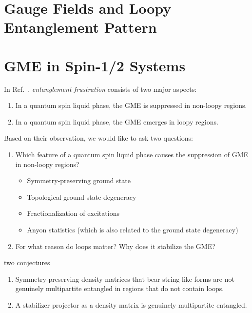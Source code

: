 \documentclass[12font]{article}
\numberwithin{equation}{section}    %
\theoremstyle{definition}
\begin{document}
\section{Gauge Fields and Loopy Entanglement Pattern}

\section{GME in Spin-1/2 Systems}
In Ref.~\cite{Lyu-Chandorkar-Kapoor-Takei-Sorensen-Witczak-Krempa_2026}, \textit{entanglement frustration} consists of two major aspects:
\begin{enumerate}
    \item In a quantum spin liquid phase, the GME is suppressed in non-loopy regions.
    \item In a quantum spin liquid phase, the GME emerges in loopy regions.
\end{enumerate}
Based on their observation, we would like to ask two questions:
\begin{enumerate}
    \item Which feature of a quantum spin liquid phase causes the suppression of GME in non-loopy regions? 
    \begin{itemize}
        \item Symmetry-preserving ground state
        \item Topological ground state degeneracy
        \item Fractionalization of excitations 
        \item Anyon statistics (which is also related to the ground state degeneracy)
    \end{itemize} 
    \item For what reason do loops matter? Why does it stabilize the GME?
\end{enumerate}

two conjectures
\begin{enumerate}
    \item Symmetry-preserving density matrices that bear string-like forms are not genuinely multipartite entangled in regions that do not contain loops.

    \item A stabilizer projector as a density matrix is genuinely multipartite entangled.
\end{enumerate}
\end{document}
